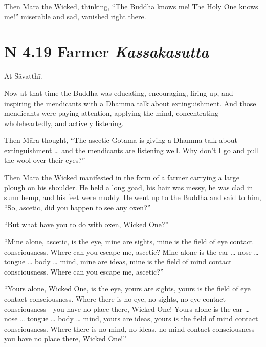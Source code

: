 \documentclass[12pt,openany]{book}%
\newcommand*{\suttatitleacronym}[1]{\smaller[2]{#1}\vspace*{.3em}}
\newcommand*{\suttatitletranslation}[1]{\linebreak{#1}}
\newcommand*{\suttatitleroot}[1]{\linebreak\smaller[2]\itshape{#1}}
\newcommand*{\tocacronym}[1]{\hspace*{-3.3em}{#1}\quad}
\newcommand*{\toctranslation}[1]{#1}
\newcommand*{\tocroot}[1]{(\textit{#1})}
\begin{document}
Then \textsanskrit{Māra} the Wicked, thinking, “The Buddha knows me! The Holy One knows me!” miserable and sad, vanished right there. 

%
\section*{{\suttatitleacronym SN 4.19}{\suttatitletranslation A Farmer }{\suttatitleroot Kassakasutta}}
\addcontentsline{toc}{section}{\tocacronym{SN 4.19} \toctranslation{A Farmer } \tocroot{Kassakasutta}}

At \textsanskrit{Sāvatthī}. 

Now at that time the Buddha was educating, encouraging, firing up, and inspiring the mendicants with a Dhamma talk about extinguishment. And those mendicants were paying attention, applying the mind, concentrating wholeheartedly, and actively listening. 

Then \textsanskrit{Māra} thought, “The ascetic Gotama is giving a Dhamma talk about extinguishment … and the mendicants are listening well. Why don’t I go and pull the wool over their eyes?” 

Then \textsanskrit{Māra} the Wicked manifested in the form of a farmer carrying a large plough on his shoulder. He held a long goad, his hair was messy, he was clad in sunn hemp, and his feet were muddy. He went up to the Buddha and said to him, “So, ascetic, did you happen to see any oxen?” 

“But what have you to do with oxen, Wicked One?” 

“Mine alone, ascetic, is the eye, mine are sights, mine is the field of eye contact consciousness. Where can you escape me, ascetic? Mine alone is the ear … nose … tongue … body … mind, mine are ideas, mine is the field of mind contact consciousness. Where can you escape me, ascetic?” 

“Yours alone, Wicked One, is the eye, yours are sights, yours is the field of eye contact consciousness. Where there is no eye, no sights, no eye contact consciousness—you have no place there, Wicked One! Yours alone is the ear … nose … tongue … body … mind, yours are ideas, yours is the field of mind contact consciousness. Where there is no mind, no ideas, no mind contact consciousness—you have no place there, Wicked One!” 
\end{document}
